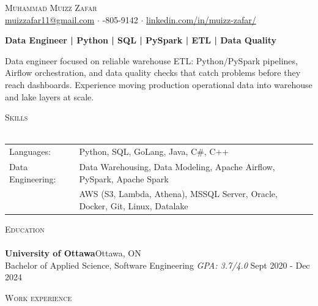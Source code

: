 \documentclass[a4paper]{article}
\newcommand{\lineunder} {
    \vspace*{-8pt} \\
    \hspace*{-18pt} \hrulefill \\
}
\newcommand{\header} [1] {
    {\hspace*{-18pt}\vspace*{6pt} \textsc{#1}}
    \vspace*{-6pt} \lineunder
}
\begin{document}
\vspace*{-40pt}

\vspace*{-10pt}
\begin{center}
	{\Huge \scshape {Muhammad Muizz Zafar}}\\
	\faSend \space \href{mailto:muizzafar11@gmail.com}{muizzafar11@gmail.com} $\cdot$ \faPhoneSquare {}-805-9142 $\cdot$ \faLinkedinSquare \space \href{https://www.linkedin.com/in/muizz-zafar/}{linkedin.com/in/muizz-zafar/}
	\\
\end{center}

\vspace{-5pt}
\begin{center}
\textbf{Data Engineer | Python | SQL | PySpark | ETL | Data Quality}
\end{center}
\begin{center}
Data engineer focused on reliable warehouse ETL: Python/PySpark pipelines, Airflow orchestration, and data quality checks that catch problems before they reach dashboards. Experience moving production operational data into warehouse and lake layers at scale.
\end{center}

\header{Skills}
\begin{tabular}{ l l }
	Languages: 
& Python, SQL, GoLang, Java, C\#, C++ \\

Data Engineering: 
& Data Warehousing, Data Modeling, Apache Airflow, PySpark, Apache Spark\\
& AWS (S3, Lambda, Athena), MSSQL Server, Oracle, Docker, Git, Linux, Datalake

\end{tabular}

\header{Education}
\textbf{University of Ottawa}\hfill Ottawa, ON\\
Bachelor of Applied Science, Software Engineering \textit{GPA: 3.7/4.0} \hfill Sept 2020 - Dec 2024\\
\vspace{2mm}

\header{Work experience}
\vspace{1.5mm}
\end{document}
